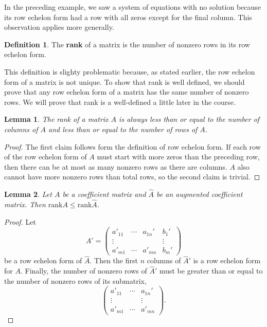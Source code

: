 \documentclass[12pt,reqno]{amsart}
\newcommand{\rank}{\mathrm{rank}}
\newtheorem{lemma}{Lemma}[section]
\theoremstyle{definition}
\newtheorem{definition}{Definition}[section]
\begin{document}
In the preceding example, we saw a system of equations with no
solution because its row echelon form had a row with all zeros except
for the final column. This observation applies more generally. 
\begin{definition}
  The \textbf{rank} of a matrix is the number of nonzero rows in its
  row echelon form. 
\end{definition}
This definition is slighty problematic because, as stated earlier, the
row echelon form of a matrix is not unique. To show that rank is well
defined, we should prove that any row echelon form of a matrix has the
same number of nonzero rows. We will prove that rank is a well-defined
a little later in the course. 
\begin{lemma}\label{lem:rankcr}
  The rank of a matrix $A$ is always less than or equal to the number
  of columns of $A$ and less than or equal to the number of rows of $A$.
\end{lemma}
\begin{proof}
  The first claim follows form the definition of row echelon form. If
  each row of the row echelon form of $A$ must start with more zeros
  than the preceding row, then there can be at most as many nonzero
  rows as there are columns. $A$ also cannot have more nonzero rows
  than total rows, so the second claim is trivial.
\end{proof}
\begin{lemma}\label{lem:rankaug}
  Let $A$ be a coefficient matrix and $\hat{A}$ be an augmented
  coefficient matrix. Then $\rank A \leq \rank \hat{A}$.
\end{lemma}
\begin{proof}
  Let 
  \[ \hat{A}' = 
  \begin{pmatrix} a'_{11} & \cdots & a_{1n}' & b_1' \\
    \vdots & & & \vdots \\
    a'_{m1} & \cdots & a'_{mn} & b_m'
  \end{pmatrix}
  \]
  be a row echelon form of $\hat{A}$. Then the first $n$ columns of
  $\hat{A}'$ is a row echelon form for $A$. Finally, the number of
  nonzero rows of $\hat{A}'$ must be greater than or equal to the
  number of nonzero rows of its submatrix, 
  \[  
  \begin{pmatrix} a'_{11} & \cdots & a_{1n}' \\
    \vdots & & \vdots \\
    a'_{m1} & \cdots & a'_{mn} 
  \end{pmatrix}.
  \]  
\end{proof}
\end{document}
